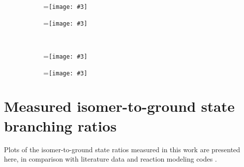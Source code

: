 \documentclass[%
 reprint,
superscriptaddress,
onecolumn,
linenumbers,
notitlepage,
 amsmath,amssymb,
 aps,
prc,
]{revtex4-1}
\newcommand{\subfigimg}[3][,]{%
  \setbox1=\hbox{\texttt{[image: \#3]}}%
  \leavevmode\rlap{\usebox1}%
  \rlap{\hspace*{50pt}\raisebox{\dimexpr\ht1-2\baselineskip}{#2}}%
  \phantom{\usebox1}%
}
\begin{document}
\begin{figure}
    \centering
    \begin{subfigure}[t]{0.49\textwidth}
        \centering
        \subfigimg[scale=0.47]{}{./figures/90Nb.pdf}
         \label{fig:90Nb}
    \end{subfigure}%
     \begin{subfigure}[t]{0.49\textwidth}
        \centering
        \subfigimg[scale=0.47]{}{./figures/91mNb.pdf}
         \label{fig:91mNb}
    \end{subfigure}%
    \\
    \begin{subfigure}[t]{0.49\textwidth}
        \centering
        \subfigimg[scale=0.47]{}{./figures/92mNb.pdf}
                 \label{fig:92mNb}
    \end{subfigure}
     \begin{subfigure}[t]{0.49\textwidth}
        \centering
        \subfigimg[scale=0.47]{}{./figures/93mMo.pdf}
         \label{fig:93mMo}
    \end{subfigure}%
     \label{fig:xs_curves_p5}
\end{figure}




% 
% 
\section{Measured isomer-to-ground state branching ratios } \label{ibr_figures}

Plots of the isomer-to-ground state ratios measured in this work are presented here, in comparison with literature data and reaction modeling codes \cite{MICHEL1997153,Ditroi2008,Titarenko2011,Graves2016}.
\end{document}
